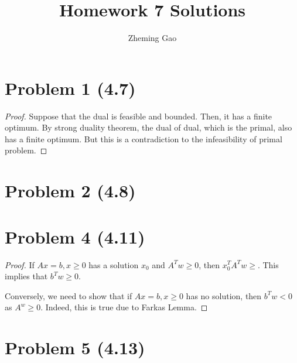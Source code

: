 \documentclass[12pt]{article}
\begin{document}
 
 
\title{Homework 7 Solutions}
\author{Zheming Gao}
\maketitle

\section*{Problem 1 (4.7)}

\begin{proof}

Suppose that the dual is feasible and bounded. Then, it has a finite optimum. By strong duality theorem, the dual of dual, which is the primal, also has a finite optimum. But this is a contradiction to the infeasibility of primal problem.

\end{proof}

\section*{Problem 2 (4.8)}






\section*{Problem 4 (4.11)}


\begin{proof}

If $Ax = b, x\geqslant 0$ has a solution $x_0$ and $A^Tw \geqslant 0$, then $x_0^TA^Tw \geqslant$. This implies that $b^Tw\geqslant 0$.

Conversely, we need to show that if $Ax = b, x\geqslant 0$ has no solution, then $b^Tw <0$ as $A^w \geqslant 0$. Indeed, this is true due to Farkas Lemma.

\end{proof}

\section*{Problem 5 (4.13)}
\end{document}
